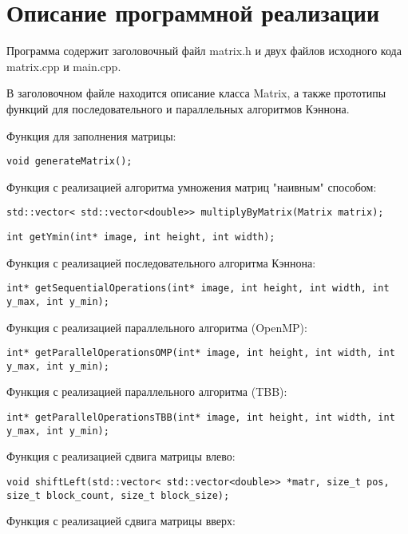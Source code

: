 \documentclass{report}
\begin{document}
\newpage

\section*{Описание программной реализации}
Программа содержит заголовочный файл matrix.h и двух файлов исходного кода matrix.cpp и main.cpp.
\par В заголовочном файле находится описание класса Matrix, а также  прототипы функций для последовательного и параллельных алгоритмов Кэннона.
\par Функция для заполнения матрицы:
\begin{lstlisting}
void generateMatrix();
\end{lstlisting}
\par Функция с реализацией алгоритма умножения матриц "наивным" способом:
\begin{lstlisting}
std::vector< std::vector<double>> multiplyByMatrix(Matrix matrix);
\end{lstlisting}
\begin{lstlisting}
int getYmin(int* image, int height, int width);
\end{lstlisting}
\par Функция с реализацией последовательного алгоритма Кэннона:
\begin{lstlisting}
int* getSequentialOperations(int* image, int height, int width, int y_max, int y_min);
\end{lstlisting}
\par Функция с реализацией параллельного алгоритма (OpenMP):
\begin{lstlisting}
int* getParallelOperationsOMP(int* image, int height, int width, int y_max, int y_min);
\end{lstlisting}
\par Функция с реализацией параллельного алгоритма (TBB):
\begin{lstlisting}
int* getParallelOperationsTBB(int* image, int height, int width, int y_max, int y_min);
\end{lstlisting}
\par Функция с реализацией сдвига матрицы влево:
\begin{lstlisting}
void shiftLeft(std::vector< std::vector<double>> *matr, size_t pos, size_t block_count, size_t block_size);
\end{lstlisting}
\par Функция с реализацией сдвига матрицы вверх:
\end{document}
